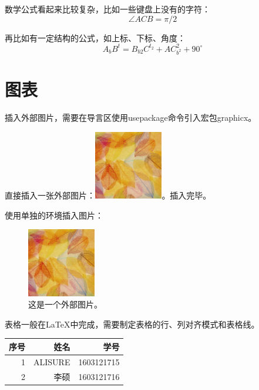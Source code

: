 \documentclass[UTF8]{ctexart}  %
\begin{document}
		数学公式看起来比较复杂，比如一些键盘上没有的字符：
		\begin{equation}
			\angle ACB = \pi / 2
		\end{equation}
		
		再比如有一定结构的公式，如上标、下标、角度：
		\begin{equation}
			A_{b}B^t = B_{b2}C^{t_2} + AC_{b^2}^{2} + 90^\circ
		\end{equation}
		
	\section{图表}
		插入外部图片，需要在导言区使用usepackage命令引入宏包graphicx。
		
		直接插入一张外部图片：\includegraphics[width=3cm,height=3cm]{../img/1.jpg}。插入完毕。
		
		使用单独的环境插入图片：
		\begin{figure}[ht]  %
			\centering  %
			\includegraphics[width=3cm,height=3cm,scale=0.1]{../img/1.jpg}  %
			\caption{这是一个外部图片。}  %
			\label{fig:1}  %
		\end{figure}
		
		表格一般在\LaTeX 中完成，需要制定表格的行、列对齐模式和表格线。
		
		\begin{tabular}{|rrr|}  %
			\hline  %
				序号 & 姓名 & 学号 \\  %
			\hline 1 & ALISURE & 1603121715 \\ 2 & 李硕 & 1603121716 \\
			\hline
		\end{tabular}
		
\end{document}
